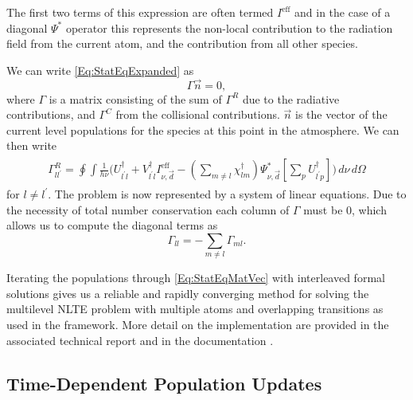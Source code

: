 The first two terms of this expression are often termed $I^\mathrm{eff}$ and in the case of a diagonal $\Psi^*$ operator this represents the non-local contribution to the radiation field from the current atom, and the contribution from all other species.

We can write \eqref{Eq:StatEqExpanded} as
\begin{equation}
    \Gamma \vec{n} = 0,
    \label{Eq:StatEqMatVec}
\end{equation}
where $\Gamma$ is a matrix consisting of the sum of $\Gamma^R$ due to the radiative contributions, and $\Gamma^C$ from the collisional contributions. $\vec{n}$ is the vector of the current level populations for the species at this point in the atmosphere.
We can then write
\begin{align}
\begin{split}\label{Eq:GammaR}
    \Gamma^R_{ll^\prime} = \oint \int \frac{1}{h\nu} \bigg( U^\dagger_{l^\prime l} + V^\dagger_{l^\prime l}I_{\nu, \vec{d}}^\mathrm{eff} -
    \left(\sum_{m\neq l}\chi^\dagger_{lm}\right) \Psi^*_{\nu, \vec{d}} \left[ \sum_p U^\dagger_{l^\prime p} \right] \bigg)\, d\nu\,d\Omega
\end{split}
\end{align}
for $l\neq l^\prime$. The problem is now represented by a system of linear equations. Due to the necessity of total number conservation each column of $\Gamma$ must be 0, which allows us to compute the diagonal terms as
\begin{equation}
    \Gamma_{ll} = -\sum_{m\neq l} \Gamma_{ml}.
\end{equation}

Iterating the populations through \eqref{Eq:StatEqMatVec} with interleaved formal solutions gives us a reliable and rapidly converging method for solving the multilevel NLTE problem with multiple atoms and overlapping transitions as used in the \Lw{} framework. More detail on the implementation are provided in the associated technical report \citep{Osborne2021} and in the documentation \NeedRef{}.

\subsection{Time-Dependent Population Updates}

